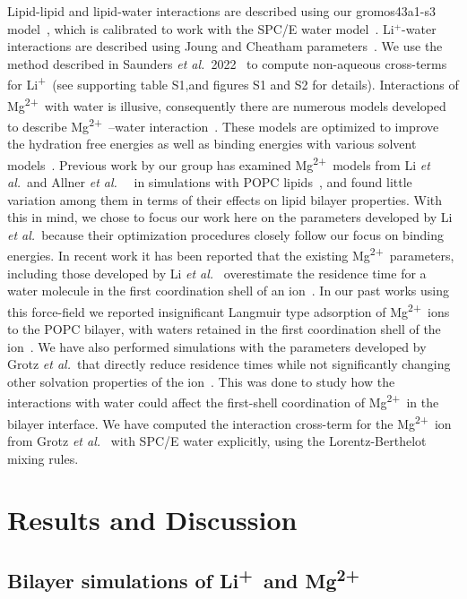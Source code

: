\documentclass[journal=langd5,manuscript=article]{achemso}
\newcommand{\etal}{\textit{et al.}~}
\newcommand{\li}{Li\textsuperscript{+}~}
\newcommand{\mg}{Mg\textsuperscript{2+}~}
\begin{document}
Lipid-lipid and lipid-water interactions are described using our 
gromos43a1-s3 model~\cite{chiu:2009}, 
which is calibrated to work with the SPC/E water model~\cite{spce}. 
Li$^+$-water interactions 
are described using Joung and Cheatham parameters~\cite{joung:2008}. 
We use the method described in Saunders \etal 2022~\cite{saunders:2022} to compute non-aqueous
cross-terms for \li (see supporting table S1,and figures S1 and S2 for details).
Interactions of \mg with water is illusive, consequently there are numerous
models developed to describe \mg--water interaction~\cite{merzparams,villaparams,microparams}.
These models are optimized to improve the hydration free energies as well as
binding energies with various solvent models~\cite{merzparams,villaparams,microparams}.  
Previous work by our group has examined \mg models
from Li \etal and Allner \etal~\cite{merzparams,villaparams} in simulations with POPC lipids~\cite{kruczek:2019}, 
and found little variation among them in terms of their effects on lipid bilayer properties. 
With this in mind, we chose to focus our work here on the parameters developed by Li \etal because
their optimization procedures closely follow our focus on binding energies.
In recent work it has been reported that the existing \mg parameters, 
including those developed by Li \etal
overestimate the residence time for a water molecule in the 
first coordination shell of an ion~\cite{microparams}. 
In our past works using this force-field we reported 
insignificant Langmuir type adsorption of \mg ions to the POPC bilayer,
with waters retained in the first coordination shell of the ion~\cite{kruczek:2019}. 
We have also performed simulations with the parameters developed by Grotz \etal that directly
reduce residence times while not significantly changing other solvation 
properties of the ion~\cite{grotz:2021:optimized,microparams}. 
This was done to study how the interactions with water
could affect the first-shell coordination of \mg in the bilayer interface. 
We have {computed} 
the interaction cross-term for the \mg ion from Grotz \etal
with SPC/E water explicitly, using {the Lorentz-Berthelot mixing rules.}
\section{Results and Discussion}
\subsection{Bilayer simulations of \li and \mg}
\end{document}
